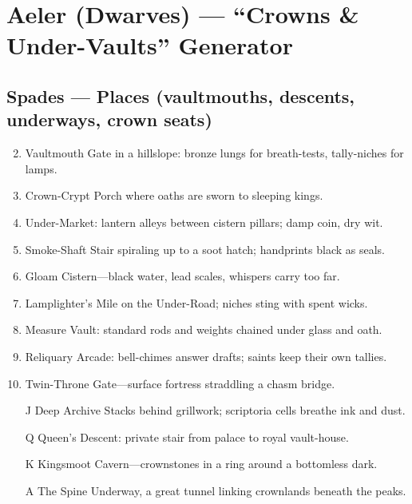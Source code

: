 \chapter{Aeler (Dwarves) --- ``Crowns \& Under-Vaults'' Generator}

\section*{Spades --- Places (vaultmouths, descents, underways, crown seats)}
\begin{enumerate}
\setcounter{enumi}{1}
\item Vaultmouth Gate in a hillslope: bronze lungs for breath-tests, tally-niches for lamps.
\item Crown-Crypt Porch where oaths are sworn to sleeping kings.
\item Under-Market: lantern alleys between cistern pillars; damp coin, dry wit.
\item Smoke-Shaft Stair spiraling up to a soot hatch; handprints black as seals.
\item Gloam Cistern---black water, lead scales, whispers carry too far.
\item Lamplighter's Mile on the Under-Road; niches sting with spent wicks.
\item Measure Vault: standard rods and weights chained under glass and oath.
\item Reliquary Arcade: bell-chimes answer drafts; saints keep their own tallies.
\item Twin-Throne Gate---surface fortress straddling a chasm bridge.
\item[J] Deep Archive Stacks behind grillwork; scriptoria cells breathe ink and dust.
\item[Q] Queen's Descent: private stair from palace to royal vault-house.
\item[K] Kingsmoot Cavern---crownstones in a ring around a bottomless dark.
\item[A] The Spine Underway, a great tunnel linking crownlands beneath the peaks.
\end{enumerate}

